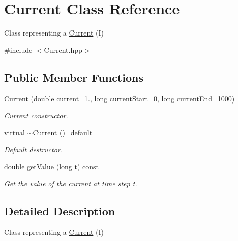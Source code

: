 \hypertarget{classCurrent}{\section{Current Class Reference}
\label{classCurrent}
}


Class representing a \hyperlink{classCurrent}{Current} (I)  




{\ttfamily \#include $<$Current.\-hpp$>$}

\subsection*{Public Member Functions}
\begin{DoxyCompactItemize}
\item 
\hyperlink{classCurrent_a702cdf44b202e2474ffd245f03a27a7e}{Current} (double current=1., long current\-Start=0, long current\-End=1000)
\begin{DoxyCompactList}\small\item\em \hyperlink{classCurrent}{Current} constructor. \end{DoxyCompactList}\item 
\hypertarget{classCurrent_a91e25000b1c9e9399fd8af1076c5b81a}{virtual \hyperlink{classCurrent_a91e25000b1c9e9399fd8af1076c5b81a}{$\sim$\-Current} ()=default}\label{classCurrent_a91e25000b1c9e9399fd8af1076c5b81a}

\begin{DoxyCompactList}\small\item\em Default destructor. \end{DoxyCompactList}\item 
\hypertarget{classCurrent_a556f4c854dd7b34b8594672726f51968}{double \hyperlink{classCurrent_a556f4c854dd7b34b8594672726f51968}{get\-Value} (long t) const }\label{classCurrent_a556f4c854dd7b34b8594672726f51968}

\begin{DoxyCompactList}\small\item\em Get the value of the current at time step t. \end{DoxyCompactList}\end{DoxyCompactItemize}


\subsection{Detailed Description}
Class representing a \hyperlink{classCurrent}{Current} (I) 

